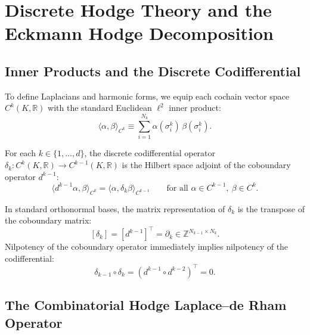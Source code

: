\section{Discrete Hodge Theory and the Eckmann Hodge Decomposition}
\label{sec:discrete_hodge_theory}

\subsection{Inner Products and the Discrete Codifferential}
\label{subsec:codifferential_inner_product}

To define Laplacians and harmonic forms, we equip each cochain vector space $C^k(K, \mathbb{R})$ with the standard Euclidean $\ell^2$ inner product:
\begin{equation}
\label{eq:cochain_inner_product}
\langle \alpha, \beta \rangle_{C^k} \equiv \sum_{i=1}^{N_k} \alpha(\sigma_i^k) \, \beta(\sigma_i^k).
\end{equation}

\begin{definition}
\label{def:codifferential}
For each $k \in \{1, \dots, d\}$, the discrete codifferential operator $\delta_k : C^k(K, \mathbb{R}) \to C^{k-1}(K, \mathbb{R})$ is the Hilbert space adjoint of the coboundary operator $d^{k-1}$:
\begin{equation}
\label{eq:codifferential_adjoint_identity}
\langle d^{k-1} \alpha, \beta \rangle_{C^k} = \langle \alpha, \delta_k \beta \rangle_{C^{k-1}} \qquad \text{for all } \alpha \in C^{k-1}, \ \beta \in C^k.
\end{equation}
\end{definition}

In standard orthonormal bases, the matrix representation of $\delta_k$ is the transpose of the coboundary matrix:
\begin{equation}
\label{eq:codifferential_transpose}
[\delta_k] = [d^{k-1}]^\top = \partial_k \in \mathbb{Z}^{N_{k-1} \times N_k}.
\end{equation}
Nilpotency of the coboundary operator immediately implies nilpotency of the codifferential:
\begin{equation}
\label{eq:codifferential_nilpotent}
\delta_{k-1} \circ \delta_k = (d^{k-1} \circ d^{k-2})^\top = 0.
\end{equation}

\subsection{The Combinatorial Hodge Laplace--de Rham Operator}
\label{subsec:combinatorial_hodge_laplacian}

